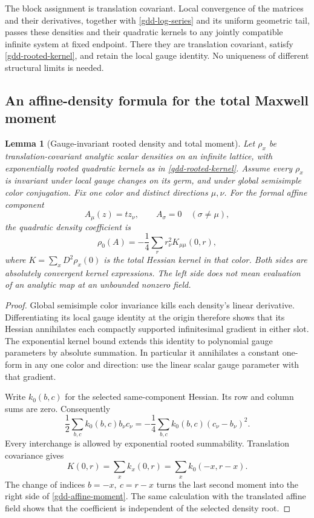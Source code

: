 \documentclass[11pt]{article}
\newtheorem{lemma}[theorem]{Lemma}
\theoremstyle{remark}
\begin{document}
The block assignment is translation covariant. Local
convergence of the matrices and their derivatives, together
with \eqref{gdd-log-series} and its uniform geometric tail,
passes these densities and their quadratic kernels to
any jointly compatible infinite system at fixed endpoint.
There they are translation covariant, satisfy
\eqref{gdd-rooted-kernel}, and retain the local gauge identity.
No uniqueness of different structural limits is needed.

\subsection{An affine-density formula for the total Maxwell moment}
\label{gdd-moment-section}

\begin{lemma}[Gauge-invariant rooted density and total moment]
\label{gdd-moment-lemma}
Let \(\rho_x\) be translation-covariant analytic scalar
densities on an infinite lattice, with exponentially
rooted quadratic kernels as in \eqref{gdd-rooted-kernel}.
Assume every \(\rho_x\) is invariant under local gauge
changes on its germ, and under global semisimple color
conjugation. Fix one color and distinct directions
\(\mu,\nu\). For the formal affine component
\[
                  A_\mu(z)=t z_\nu,\qquad A_\sigma=0
                    \quad(\sigma\ne\mu),
\]
the quadratic density coefficient is
\begin{equation}
 [t^2]\rho_0(A)
       =-\frac14\sum_r r_\nu^2 K_{\mu\mu}(0,r),
 \label{gdd-affine-moment}
\end{equation}
where \(K=\sum_x D^2\rho_x(0)\) is the total Hessian
kernel in that color. Both sides are absolutely convergent
kernel expressions. The left side does not mean evaluation
of an analytic map at an unbounded nonzero field.
\end{lemma}

\begin{proof}
Global semisimple color invariance kills each density's
linear derivative. Differentiating its local gauge identity
at the origin therefore shows that its Hessian annihilates
each compactly supported infinitesimal gradient in either
slot. The exponential kernel bound extends this identity
to polynomial gauge parameters by absolute summation.
In particular it annihilates a constant one-form in any
one color and direction: use the linear scalar gauge
parameter with that gradient.

Write \(k_0(b,c)\) for the selected same-component Hessian.
Its row and column sums are zero. Consequently
\[
 \frac12\sum_{b,c} k_0(b,c)b_\nu c_\nu
   =-\frac14\sum_{b,c}k_0(b,c)(c_\nu-b_\nu)^2.
\]
Every interchange is allowed by exponential rooted
summability. Translation covariance gives
\[
 K(0,r)=\sum_x k_x(0,r)=\sum_x k_0(-x,r-x).
\]
The change of indices \(b=-x,\ c=r-x\) turns the last
second moment into the right side of
\eqref{gdd-affine-moment}. The same calculation with
the translated affine field shows that the coefficient
is independent of the selected density root.
\end{proof}
\end{document}
